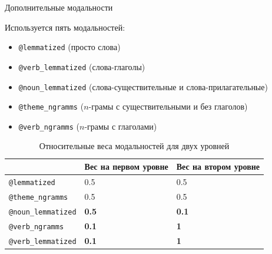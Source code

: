 \begin{frame}{Дополнительные модальности}

Используется пять модальностей:
\begin{itemize}
    \item \texttt{@lemmatized} (просто слова)
    \item \texttt{@verb\_lemmatized} (слова-глаголы)
    \item \texttt{@noun\_lemmatized} (слова-существительные и слова-прилагательные)
    \item \texttt{@theme\_ngramms} ($n$-грамы с существительными и без глаголов)
    \item \texttt{@verb\_ngramms} ($n$-грамы с глаголами)
\end{itemize}

\begin{table}[!t]
\begin{tabular}{|l|l|l|}\hline
                & Вес на первом уровне & Вес на втором уровне \\ \hline
\texttt{@lemmatized}     & 0.5                  & 0.5                  \\ \hline
 \texttt{@theme\_ngramms}   & 0.5                  & 0.5                  \\ 
\texttt{@noun\_lemmatized} & \textbf{0.5}                  & \textbf{0.1}                 \\ \hline
\texttt{@verb\_ngramms}    & \textbf{0.1}                  & \textbf{1}                    \\ 
\texttt{@verb\_lemmatized} & \textbf{0.1}                  & \textbf{1}                    \\ \hline
\end{tabular}
\caption{Относительные веса модальностей для двух уровней}
\end{table}

\end{frame}


